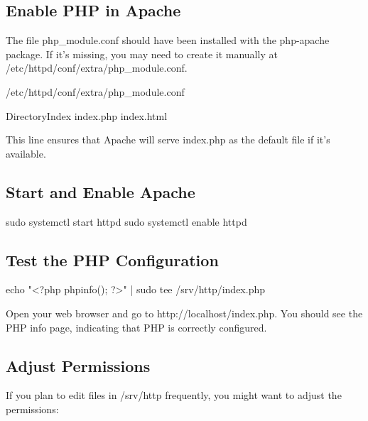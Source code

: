 \documentclass{report}
\begin{document}
    \subsection{Enable PHP in Apache}
    \bigbreak \noindent 
    The file php\_module.conf should have been installed with the php-apache package. If it's missing, you may need to create it manually at /etc/httpd/conf/extra/php\_module.conf.
    \bigbreak \noindent 
    \begin{bashcode}
    /etc/httpd/conf/extra/php\_module.conf
    \end{bashcode}
    \bigbreak \noindent 
    \begin{bashcode}
    DirectoryIndex index.php index.html
    \end{bashcode}
    \bigbreak \noindent 
    This line ensures that Apache will serve index.php as the default file if it’s available.
    \bigbreak \noindent 
    \subsection{Start and Enable Apache}
    \bigbreak \noindent 
    \begin{bashcode}
        sudo systemctl start httpd
        sudo systemctl enable httpd
    \end{bashcode}
    \bigbreak \noindent 
    \subsection{Test the PHP Configuration}
    \bigbreak \noindent 
    \begin{bashcode}
        echo "<?php phpinfo(); ?>" | sudo tee /srv/http/index.php
    \end{bashcode}
    \bigbreak \noindent 
    Open your web browser and go to http://localhost/index.php. You should see the PHP info page, indicating that PHP is correctly configured.
    \bigbreak \noindent 
    \subsection{Adjust Permissions}
    \bigbreak \noindent 
    If you plan to edit files in /srv/http frequently, you might want to adjust the permissions:
    \bigbreak \noindent 
    \bigbreak \noindent 
\end{document}
